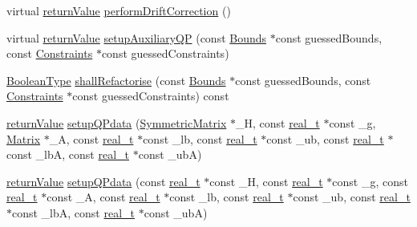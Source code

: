 \begin{DoxyCompactItemize}
\item 
virtual \hyperlink{_message_handling_8hpp_a81d556f613bfbabd0b1f9488c0fa865e}{return\+Value} \hyperlink{class_q_problem_a3535afaf58904aa56fd17e4e49eb50aa}{perform\+Drift\+Correction} ()
\item 
virtual \hyperlink{_message_handling_8hpp_a81d556f613bfbabd0b1f9488c0fa865e}{return\+Value} \hyperlink{class_q_problem_af76db9fd0aa230001e11b5c86bbfbae9}{setup\+Auxiliary\+QP} (const \hyperlink{class_bounds}{Bounds} $\ast$const guessed\+Bounds, const \hyperlink{class_constraints}{Constraints} $\ast$const guessed\+Constraints)
\item 
\hyperlink{_types_8hpp_a20f82124c82b6f5686a7fce454ef9089}{Boolean\+Type} \hyperlink{class_q_problem_a93d48ae7575d0cafff730a2a018bfdb3}{shall\+Refactorise} (const \hyperlink{class_bounds}{Bounds} $\ast$const guessed\+Bounds, const \hyperlink{class_constraints}{Constraints} $\ast$const guessed\+Constraints) const
\item 
\hyperlink{_message_handling_8hpp_a81d556f613bfbabd0b1f9488c0fa865e}{return\+Value} \hyperlink{class_q_problem_a795e8ecc363ab25f15ffaf12a9ec4040}{setup\+Q\+Pdata} (\hyperlink{class_symmetric_matrix}{Symmetric\+Matrix} $\ast$\+\_\+H, const \hyperlink{qp_o_a_s_e_s__wrapper_8h_a0d00e2b3dfadee81331bbb39068570c4}{real\+\_\+t} $\ast$const \+\_\+g, \hyperlink{class_matrix}{Matrix} $\ast$\+\_\+A, const \hyperlink{qp_o_a_s_e_s__wrapper_8h_a0d00e2b3dfadee81331bbb39068570c4}{real\+\_\+t} $\ast$const \+\_\+lb, const \hyperlink{qp_o_a_s_e_s__wrapper_8h_a0d00e2b3dfadee81331bbb39068570c4}{real\+\_\+t} $\ast$const \+\_\+ub, const \hyperlink{qp_o_a_s_e_s__wrapper_8h_a0d00e2b3dfadee81331bbb39068570c4}{real\+\_\+t} $\ast$const \+\_\+lbA, const \hyperlink{qp_o_a_s_e_s__wrapper_8h_a0d00e2b3dfadee81331bbb39068570c4}{real\+\_\+t} $\ast$const \+\_\+ubA)
\item 
\hyperlink{_message_handling_8hpp_a81d556f613bfbabd0b1f9488c0fa865e}{return\+Value} \hyperlink{class_q_problem_a7efaf9fce5842504ec156a0254599a7f}{setup\+Q\+Pdata} (const \hyperlink{qp_o_a_s_e_s__wrapper_8h_a0d00e2b3dfadee81331bbb39068570c4}{real\+\_\+t} $\ast$const \+\_\+H, const \hyperlink{qp_o_a_s_e_s__wrapper_8h_a0d00e2b3dfadee81331bbb39068570c4}{real\+\_\+t} $\ast$const \+\_\+g, const \hyperlink{qp_o_a_s_e_s__wrapper_8h_a0d00e2b3dfadee81331bbb39068570c4}{real\+\_\+t} $\ast$const \+\_\+A, const \hyperlink{qp_o_a_s_e_s__wrapper_8h_a0d00e2b3dfadee81331bbb39068570c4}{real\+\_\+t} $\ast$const \+\_\+lb, const \hyperlink{qp_o_a_s_e_s__wrapper_8h_a0d00e2b3dfadee81331bbb39068570c4}{real\+\_\+t} $\ast$const \+\_\+ub, const \hyperlink{qp_o_a_s_e_s__wrapper_8h_a0d00e2b3dfadee81331bbb39068570c4}{real\+\_\+t} $\ast$const \+\_\+lbA, const \hyperlink{qp_o_a_s_e_s__wrapper_8h_a0d00e2b3dfadee81331bbb39068570c4}{real\+\_\+t} $\ast$const \+\_\+ubA)

\end{DoxyCompactItemize}
